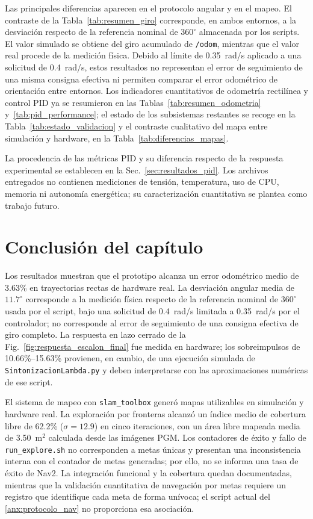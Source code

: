 Las principales diferencias aparecen en el protocolo angular y en el mapeo. El contraste de la Tabla~\ref{tab:resumen_giro} corresponde, en ambos entornos, a la desviación respecto de la referencia nominal de $360^\circ$ almacenada por los scripts. El valor simulado se obtiene del giro acumulado de \texttt{/odom}, mientras que el valor real procede de la medición física. Debido al límite de 0.35~rad/s aplicado a una solicitud de 0.4~rad/s, estos resultados no representan el error de seguimiento de una misma consigna efectiva ni permiten comparar el error odométrico de orientación entre entornos. Los indicadores cuantitativos de odometría rectilínea y control PID ya se resumieron en las Tablas~\ref{tab:resumen_odometria} y~\ref{tab:pid_performance}; el estado de los subsistemas restantes se recoge en la Tabla~\ref{tab:estado_validacion} y el contraste cualitativo del mapa entre simulación y hardware, en la Tabla~\ref{tab:diferencias_mapas}.

La procedencia de las métricas PID y su diferencia respecto de la respuesta experimental se establecen en la Sec.~\ref{sec:resultados_pid}. Los archivos entregados no contienen mediciones de tensión, temperatura, uso de CPU, memoria ni autonomía energética; su caracterización cuantitativa se plantea como trabajo futuro.

\section*{Conclusión del capítulo}
\label{sec:conclusion_resultados}

Los resultados muestran que el prototipo alcanza un error odométrico medio de 3.63\% en trayectorias rectas de hardware real. La desviación angular media de $11.7^\circ$ corresponde a la medición física respecto de la referencia nominal de $360^\circ$ usada por el script, bajo una solicitud de 0.4~rad/s limitada a 0.35~rad/s por el controlador; no corresponde al error de seguimiento de una consigna efectiva de giro completo. La respuesta en lazo cerrado de la Fig.~\ref{fig:respuesta_escalon_final} fue medida en hardware; los sobreimpulsos de 10.66\%--15.63\% provienen, en cambio, de una ejecución simulada de \texttt{SintonizacionLambda.py} y deben interpretarse con las aproximaciones numéricas de ese script.

El sistema de mapeo con \texttt{slam\_toolbox} generó mapas utilizables en
simulación y hardware real. La exploración por fronteras alcanzó un índice medio
de cobertura libre de 62.2\% ($\sigma=12.9$) en cinco iteraciones, con un
área libre mapeada media de 3.50~m$^2$ calculada desde las imágenes PGM. Los contadores de éxito y fallo de
\texttt{run\_explore.sh} no corresponden a metas únicas y presentan una
inconsistencia interna con el contador de metas generadas; por ello, no se
informa una tasa de éxito de Nav2. La integración funcional y la cobertura
quedan documentadas, mientras que la validación cuantitativa de navegación por
metas requiere un registro que identifique cada meta de forma unívoca; el script
actual del \ref{anx:protocolo_nav} no proporciona esa asociación.